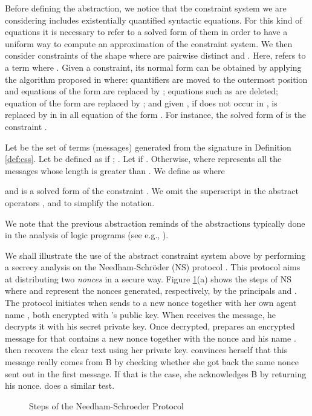 \documentclass{tlp}
\begin{document}
Before defining the abstraction, we notice that the constraint system  we are considering includes existentially quantified syntactic  equations. For this kind of equations it is necessary to refer to a solved form of them  in order to have a uniform way to compute an approximation of the constraint system. We then consider constraints of the shape  where  are pairwise distinct   and . Here,  
  refers to a term where . Given a constraint, its normal form  can be obtained by applying the algorithm proposed in \cite{Mah88b} where: quantifiers are moved to the outermost position and equations of the form 
are replaced by  ; equations such as    are deleted; equation of the form  are replaced by ; and given , if  does not occur in ,  is replaced by  in  in all equation of the form .  For instance, the solved form of  is the constraint .



\begin{definition}\label{def:abs-sec-cs}
Let  be the set of terms (messages) generated from the signature  in Definition \ref{def:css}. Let    be defined as 
 if ; . 
Let  if  . Otherwise,    
where   represents  all the messages  whose length is greater than . 
We define  as  where

and  is a solved form  of the constraint .
We  omit the superscript  in the abstract operators ,  and  to simplify the notation. 
\end{definition}

We note that the previous abstraction reminds of 
the  abstractions typically done 
in the analysis of logic programs (see e.g., \cite{ST84}). 

We shall illustrate the use of the abstract constraint system above by performing a secrecy analysis on the
Needham-Schr\"oder  (NS) protocol \cite{lowe95attack}. This protocol aims at distributing two \emph{nonces} in a secure way. 
Figure \ref{fig:ns}(a) shows the steps of NS where  and  represent  the nonces generated, respectively,  by the principals  and .
The protocol initiates when 
 sends to  a new 
nonce  together with her own agent name , both encrypted with 's public key. When  receives the message,
he decrypts it with his secret private key. Once decrypted, 
 prepares an encrypted message for  that contains 
a new nonce  together with the nonce   and his name .    then 
recovers the clear text using her private key.  convinces 
herself that this message really comes from B by checking 
whether she got back the same nonce sent out in the first 
message. If that is the case, she acknowledges B by returning his nonce. 
 does a similar test. 
\begin{figure}
\resizebox{.8\textwidth}{!}{
\subfloat[]{

}
\quad
\subfloat[]{

}
}
\caption {Steps of the Needham-Schroeder Protocol \label{fig:ns}}
\end{figure}
\end{document}
